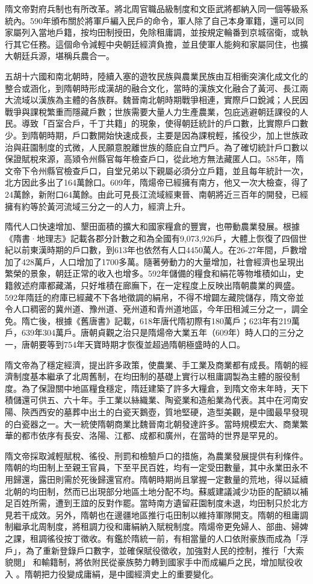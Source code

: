 隋文帝對府兵制也有所改革。將北周官職品級制度和文臣武將都納入同一個等級系統內。590年頒布關於將軍戶編入民戶的命令，軍人除了自己本身軍籍，還可以同家屬列入當地戶籍，按均田制授田，免除租庸調，並按規定輪番到京城宿衛，或執行其它任務。這個命令減輕中央朝廷經濟負擔，並且使軍人能夠和家屬同住，也擴大朝廷兵源，堪稱兵農合一。

五胡十六國和南北朝時，陸續入塞的遊牧民族與農業民族由互相衝突演化成文化的整合或涵化，到隋朝時形成漢胡的融合文化，當時的漢族文化融合了黃河、長江兩大流域以漢族為主體的各族群。魏晉南北朝時期戰爭相連，實際戶口銳減；人民因戰爭與課稅繁重而隱藏戶數；世族需要大量人力生產農業，包庇逃避朝廷課役的人民。導致「百室合戶，千丁共籍」的現象，使得朝廷統計的戶口數，比實際戶口數少。到隋朝時期，戶口數開始快速成長，主要是因為課稅輕，搖役少，加上世族政治與莊園制度的式微，人民願意脫離世族的蔭庇自立門戶。為了確切統計戶口數以保證賦稅來源，高熲令州縣官每年檢查戶口，從此地方無法藏匿人口。585年，隋文帝下令州縣官檢查戶口，自堂兄弟以下親屬必須分立戶籍，並且每年統計一次，北方因此多出了164萬餘口。609年，隋煬帝已經擁有南方，他又一次大檢查，得了24萬餘，新附口64萬餘。由此可見長江流域經東晉、南朝將近三百年的開發，已經擁有約等於黃河流域三分之一的人力，經濟上升。

隋代人口快速增加、墾田面積的擴大和國家糧倉的豐實，也帶動農業發展。根據《隋書·地理志》記載各郡分計數之和為全國有9,073,926戶，大體上恢復了四個世紀以前東漢時期的戶口數，到613年也依然有人口4450萬人。在26-27年間，戶數增加了428萬戶，人口增加了1700多萬。隨著勞動力的大量增加，社會經濟也呈現出繁榮的景象，朝廷正常的收入也增多。592年儲備的糧食和絹花等物堆積如山，史籍敘述府庫都藏滿，只好堆積在廊廡下，在一定程度上反映出隋朝農業的興盛。592年隋廷的府庫已經藏不下各地徵調的絹帛，不得不增闢左藏院儲存，隋文帝並令人口稠密的冀州道、豫州道、兗州道和青州道地區，今年田租減三分之一，調全免。隋亡後，根據《舊唐書》記載，618年唐代隋初際有180萬戶；623年有219萬戶，639年304萬戶。唐朝貞觀之治只是隋煬帝大業五年（609年）時人口的三分之一，唐朝要等到754年天寶時期才恢復並超過隋朝極盛時的人口。

隋文帝為了穩定經濟，提出許多政策，使農業、手工業及商業都有成長。隋朝的經濟制度基本繼承了北周舊制，在均田制的基礎上實行以租庸調製為主體的服役制度。為了保證關中地區糧食穩定，隋廷建築了許多大糧倉，到隋文帝末年時，天下積儲還可供五、六十年。手工業以絲織業、陶瓷業和造船業為代表。其中在河南安陽、陝西西安的墓葬中出土的白瓷天鵝壺，質地堅硬，造型美觀，是中國最早發現的白瓷器之一。大一統使隋朝商業比魏晉南北朝發達許多。當時規模宏大、商業繁華的都市依序有長安、洛陽、江都、成都和廣州，在當時的世界是罕見的。

隋文帝採取減輕賦稅、徭役、刑罰和檢驗戶口的措施，為農業發展提供有利條件。隋朝的均田制上至親王官員，下至平民百姓，均有一定受田數量，其中永業田永不用歸還，露田則需於死後歸還官府。隋朝時期尚且掌握一定數量的荒地，得以延續北朝的均田制，然而已出現部分地區土地分配不均。蘇威建議減少功臣的配額以補足百姓所需，遭到王誼的反對作罷。當時南方遺留莊園制度未退，均田制只於北方見若干成效。另外，隋朝也在邊疆地區推行屯田制以維持軍隊開支。隋朝的租庸調制繼承北周制度，將租調力役和庸絹納入賦稅制度。隋煬帝更免婦人、部曲、婦婢之課，租調徭役按丁徵收。有鑑於隋統一前，有相當量的人口依附豪族而成為「浮戶」，為了重新登錄戶口數字，並確保賦役徵收，加強對人民的控制，推行「大索貌閱」 和輸籍制，將依附民從豪族勢力轉到國家手中而成編戶之民，增加賦役收入 。隋朝把力役變成庸絹，是中國經濟史上的重要變化。

